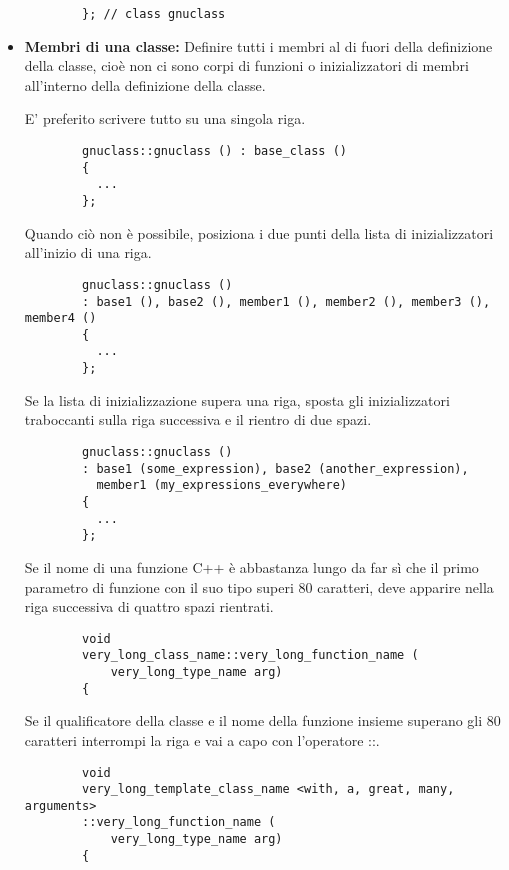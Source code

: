 \documentclass[../NomeDocumento.tex]{subfiles}
\begin{document}
\begin{itemize}
		\begin{verbatim}
		}; // class gnuclass
		\end{verbatim}
		
		\item \textbf{Membri di una classe:} Definire tutti i membri al di fuori della definizione della classe, cioè non ci sono corpi di funzioni o inizializzatori di membri all'interno della definizione della classe.
		
		E' preferito scrivere tutto su una singola riga.
		
		\begin{verbatim}
		gnuclass::gnuclass () : base_class ()
		{ 
		  ...
		};
		\end{verbatim}
		
		Quando ciò non è possibile, posiziona i due punti della lista di inizializzatori all'inizio di una riga.
		
		\begin{verbatim}
		gnuclass::gnuclass ()
		: base1 (), base2 (), member1 (), member2 (), member3 (), member4 ()
		{ 
		  ...
		};
		\end{verbatim}
		
		Se la lista di inizializzazione supera una riga, sposta gli inizializzatori traboccanti sulla riga successiva e il rientro di due spazi.
		
		\begin{verbatim}
		gnuclass::gnuclass ()
		: base1 (some_expression), base2 (another_expression),
		  member1 (my_expressions_everywhere)
		{ 
		  ...
		};
		\end{verbatim}
		
		Se il nome di una funzione C++ è abbastanza lungo da far sì che il primo parametro di funzione con il suo tipo superi 80 caratteri, deve apparire nella riga successiva di quattro spazi rientrati.
		
		\begin{verbatim}
		void
		very_long_class_name::very_long_function_name (
		    very_long_type_name arg)
		{
		\end{verbatim}
		
		Se il qualificatore della classe e il nome della funzione insieme superano gli 80 caratteri interrompi la riga e vai a capo con l'operatore ::.
		
		\begin{verbatim}
		void
		very_long_template_class_name <with, a, great, many, arguments>
		::very_long_function_name (
		    very_long_type_name arg)
		{
		\end{verbatim}		
		

\end{itemize}
\end{document}
